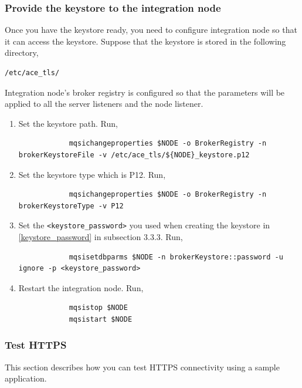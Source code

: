 \documentclass{article}
\begin{document}
    \subsubsection{Provide the keystore to the integration node}
    Once you have the keystore ready, you need to configure integration node so that it can access the keystore.
    Suppose that the keystore is stored in the following directory,
    \begin{lstlisting}[gobble=8]
        /etc/ace_tls/
    \end{lstlisting}

    Integration node's broker registry is configured so that the parameters will be applied to all the server listeners and the node listener.
    \begin{enumerate}
        \item Set the keystore path. Run,
        \begin{lstlisting}
            mqsichangeproperties $NODE -o BrokerRegistry -n brokerKeystoreFile -v /etc/ace_tls/${NODE}_keystore.p12
        \end{lstlisting}
        \item Set the keystore type which is P12. Run,
        \begin{lstlisting}
            mqsichangeproperties $NODE -o BrokerRegistry -n brokerKeystoreType -v P12
        \end{lstlisting}
        \item Set the \lstinline{<keystore_password>} you used when creating the keystore in \ref{keystore_password} in subsection 3.3.3. Run,
        \begin{lstlisting}
            mqsisetdbparms $NODE -n brokerKeystore::password -u ignore -p <keystore_password>
        \end{lstlisting}
        \item Restart the integration node. Run,
        \begin{lstlisting}
            mqsistop $NODE
            mqsistart $NODE
        \end{lstlisting}
    \end{enumerate}
    \subsubsection{Test HTTPS}
    \label{test_https}
    This section describes how you can test HTTPS connectivity using a sample application.
\end{document}
